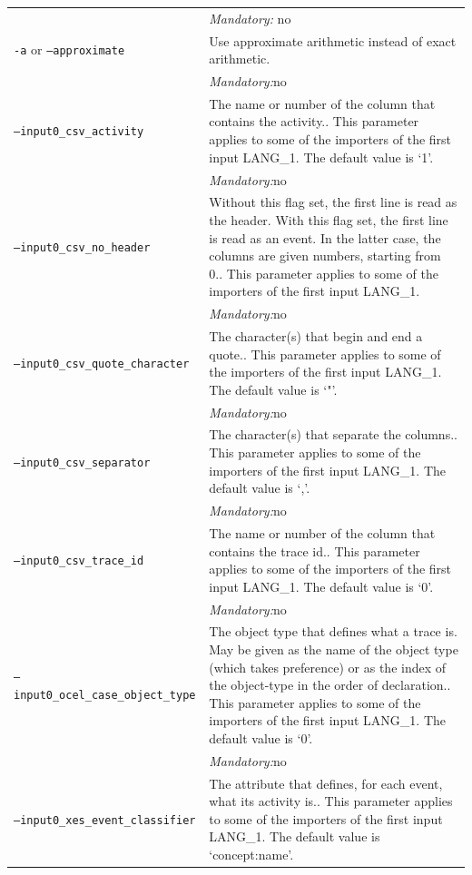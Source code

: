 {\begin{tabularx}{\linewidth}{lX}
&\textit{Mandatory:} \quad no\\
\texttt{-a} or \texttt{--approximate} & Use approximate arithmetic instead of exact arithmetic.\\
&\textit{Mandatory:}\quad no\\
\texttt{--input0\_csv\_activity} & The name or number of the column that contains the activity.. This parameter applies to some of the importers of the first input LANG\_1. The default value is `1'.\\
&\textit{Mandatory:}\quad no\\
\texttt{--input0\_csv\_no\_header} & Without this flag set, the first line is read as the header. 
    With this flag set, the first line is read as an event. In the latter case, the columns are given numbers, starting from 0.. This parameter applies to some of the importers of the first input LANG\_1. \\
&\textit{Mandatory:}\quad no\\
\texttt{--input0\_csv\_quote\_character} & The character(s) that begin and end a quote.. This parameter applies to some of the importers of the first input LANG\_1. The default value is `"'.\\
&\textit{Mandatory:}\quad no\\
\texttt{--input0\_csv\_separator} & The character(s) that separate the columns.. This parameter applies to some of the importers of the first input LANG\_1. The default value is `,'.\\
&\textit{Mandatory:}\quad no\\
\texttt{--input0\_csv\_trace\_id} & The name or number of the column that contains the trace id.. This parameter applies to some of the importers of the first input LANG\_1. The default value is `0'.\\
&\textit{Mandatory:}\quad no\\
\texttt{--input0\_ocel\_case\_object\_type} & The object type that defines what a trace is. May be given as the name of the object type (which takes preference) or as the index of the object-type in the order of declaration.. This parameter applies to some of the importers of the first input LANG\_1. The default value is `0'.\\
&\textit{Mandatory:}\quad no\\
\texttt{--input0\_xes\_event\_classifier} & The attribute that defines, for each event, what its activity is.. This parameter applies to some of the importers of the first input LANG\_1. The default value is `concept:name'.\\

\end{tabularx}}
